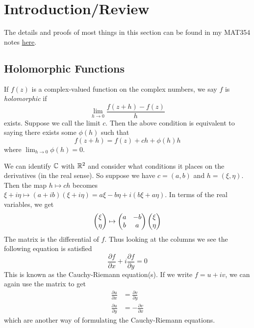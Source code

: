 \section{Introduction/Review}
The details and proofs of most things in this section can be found in my MAT354 notes \href{http://individual.utoronto.ca/rishibhp/notes/MAT354_notes.pdf}{here}.

\subsection{Holomorphic Functions}
If $f(z)$ is a complex-valued function on the complex numbers, we say $f$ is \textit{holomorphic} if
$$\lim_{h \to 0} \frac{f(z + h) - f(z)}{h}$$
exists. Suppose we call the limit $c$.
Then the above condition is equivalent to saying there exists some $\phi(h)$ such that
$$f(z + h) = f(z) + ch + \phi(h)h$$
where $\lim_{h \to 0} \phi(h) = 0$.

We can identify $\mathbb{C}$ with $\mathbb{R}^2$ and consider what conditions it places on the derivatives (in the real sense). So suppose we have $c = (a, b)$ and $h = (\xi, \eta)$. Then the map $h \mapsto ch$ becomes $\xi + i \eta \mapsto (a + ib)(\xi + i \eta) = a\xi - b\eta + i(b \xi + a \eta)$. In terms of the real variables, we get
$$\begin{pmatrix} \xi \\ \eta \end{pmatrix} \mapsto \begin{pmatrix} a & -b\\b & a \end{pmatrix} \begin{pmatrix} \xi \\ \eta \end{pmatrix}$$
The matrix is the differential of $f$. Thus looking at the columns we see the following equation is satisfied
$$\frac{\partial f}{\partial x} + i \frac{\partial f}{\partial y} = 0$$
This is known as the Cauchy-Riemann equation(s). If we write $f = u + iv$, we can again use the matrix to get
\begin{align*}
    \frac{\partial u}{\partial x} &= \frac{\partial v}{\partial y}\\ 
    \frac{\partial u}{\partial y} &= -\frac{\partial v}{\partial x} 
\end{align*}
which are another way of formulating the Cauchy-Riemann equations.

